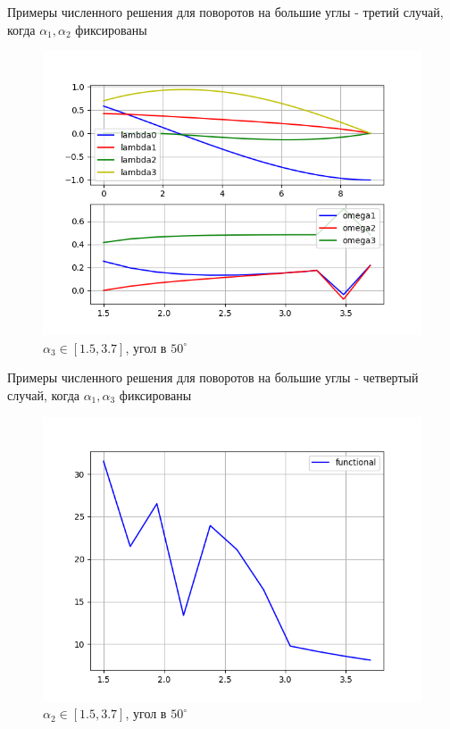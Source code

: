 \documentclass[10pt,utf8,presentation,notheorems,xcolor=dvipsnames,compress]{beamer}
\begin{document}
\begin{frame}{Примеры численного решения для поворотов на большие углы - третий случай, когда $\alpha_1, \alpha_2$ фиксированы}
\begin{figure}[H]
\center\includegraphics[scale=0.5]{fig/ivp_and_control_1_5-3_7_50.png}
\caption{$\alpha_3 \in [1.5, 3.7]$, угол в $50^{\circ}$}
\end{figure}
\end{frame}

\begin{frame}{Примеры численного решения для поворотов на большие углы - четвертый случай, когда $\alpha_1, \alpha_3$ фиксированы}
\begin{figure}[H]
\center\includegraphics[scale=0.5]{fig/functional_alpha2_1_5-3_7_50.png}
\caption{$\alpha_2 \in [1.5, 3.7]$, угол в $50^{\circ}$}
\end{figure}
\end{frame}
\end{document}
